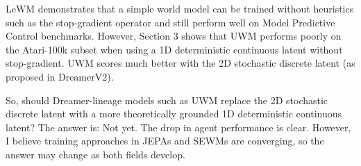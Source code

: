 \documentclass[11pt]{article}
\begin{document}
LeWM demonstrates that a simple world model can be trained without heuristics such as the stop-gradient operator and still perform well on Model Predictive Control benchmarks. However, Section 3 shows that UWM performs poorly on the Atari-100k subset when using a 1D deterministic continuous latent without stop-gradient. UWM scores much better with the 2D stochastic discrete latent (as proposed in DreamerV2).

So, should Dreamer-lineage models such as UWM replace the 2D stochastic discrete latent with a more theoretically grounded 1D deterministic continuous latent? The answer is: Not yet. The drop in agent performance is clear. However, I believe training approaches in JEPAs and SEWMs are converging, so the answer may change as both fields develop.



\end{document}
